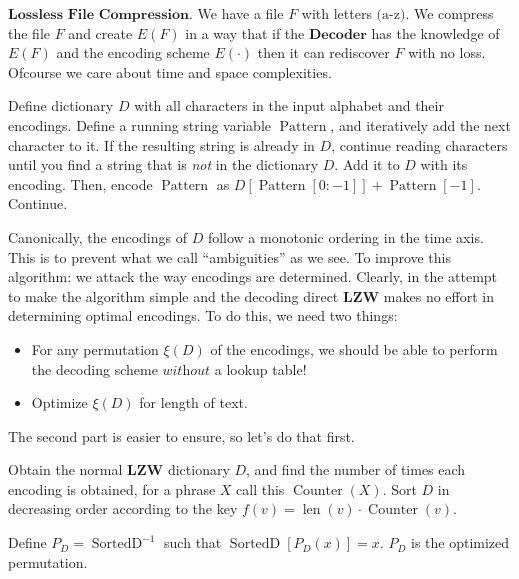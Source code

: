 \documentclass[scrartcl]{article}
\begin{document}
\begin{context}
    $\textbf{Lossless File Compression}$. We have a file $F$ with letters $\text{(a-z)}$. We compress the file $F$ and create $E(F)$ in a way that if the $\textbf{Decoder}$ has the knowledge of $E(F)$ and the encoding scheme $E(\cdot)$ then it can rediscover $F$ with no loss. Ofcourse we care about time and space complexities. 
\end{context}
\begin{proposition*}
    Define dictionary $D$ with all characters in the input alphabet and their encodings. Define a running string variable $\operatorname{Pattern}$, and iteratively add the next character to it. If the resulting string is already in $D$, continue reading characters until you find a string that is \textit{not} in the dictionary $D$. Add it to $D$ with its encoding. Then, encode $\operatorname{Pattern}$ as $D[\operatorname{Pattern}[0:-1]] + \operatorname{Pattern}[-1]$. Continue.
\end{proposition*}
\begin{example*}
    \newline
    \newline

\end{example*}
Canonically, the encodings of $D$ follow a monotonic ordering in the time axis. This is to prevent what we call ``ambiguities'' as we see.
To improve this algorithm: we attack the way encodings are determined. Clearly, in the attempt to make the algorithm simple and the decoding direct $\textbf{LZW}$ makes no effort in determining optimal encodings.
To do this, we need two things: 
\begin{itemize}
    \item For any permutation $\xi(D)$ of the encodings, we should be able to perform the decoding scheme $\textit{without}$ a lookup table!
    \item Optimize $\xi(D)$ for length of text. 
\end{itemize}
The second part is easier to ensure, so let's do that first.

\begin{proposition*}
    Obtain the normal $\textbf{LZW}$ dictionary $D$, and find the number of times each encoding is obtained, for a phrase $X$
    call this $\operatorname{Counter}(X)$. Sort $D$ in decreasing order according to the key $f(v) = \operatorname{len}(v)\cdot\operatorname{Counter}(v)$. \newline

    Define $P_D = \operatorname{SortedD}^{-1}$ such that $\operatorname{SortedD}[P_D(x)] = x$. $P_D$ is the optimized permutation.
\end{proposition*}
\end{document}
